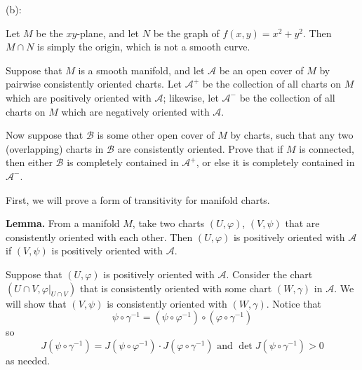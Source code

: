 \documentclass{../../../tex-setup/eh-homework}
\begin{document}
\begin{question}{43}
        \medskip

        (b):

        Let \(M\) be the \(xy\)-plane, and let \(N\) be the graph of \(f(x,y) = x^2 + y^2\). Then \(M \cap N\) is simply the origin, which is not a smooth curve.
    \end{question}
    \newpage
    \begin{question}{44}
        Suppose that $M$ is a smooth manifold, and let $\mathcal{A}$ be an open cover of $M$ by pairwise consistently oriented charts. Let $\mathcal{A}^+$ be the collection of all charts on $M$ which are positively oriented with $\mathcal{A}$; likewise, let $\mathcal{A}^-$ be the collection of all charts on $M$ which are negatively oriented with $\mathcal{A}$.

        Now suppose that $\mathcal{B}$ is some other open cover of $M$ by charts, such that any two (overlapping) charts in $\mathcal{B}$ are consistently oriented. Prove that if $M$ is connected, then either $\mathcal{B}$ is completely contained in $\mathcal{A}^+$, or else it is completely contained in $\mathcal{A}^-$.

        \tcblower

        First, we will prove a form of transitivity for manifold charts.

        \textbf{Lemma.} From a manifold \(M\), take two charts \((U, \varphi)\), \((V, \psi)\) that are consistently oriented with each other. Then \((U ,\varphi)\) is positively oriented with \(\mathcal{A}\) if \((V, \psi)\) is positively oriented with \(\mathcal{A}\).

        Suppose that \((U, \varphi)\) is positively oriented with \(\mathcal{A}\). Consider the chart \((U \cap V, \varphi | _{U \cap V})\) that is consistently oriented with some chart \((W, \gamma)\) in \(\mathcal{A}\). We will show that \((V, \psi)\) is consistently oriented with \((W, \gamma)\). Notice that
        \[
            \psi \circ \gamma^{-1} = (\psi \circ \varphi^{-1}) \circ (\varphi \circ \gamma^{-1})
        \]
        so
        \[
            J (\psi \circ \gamma^{-1}) = J (\psi \circ \varphi^{-1}) \cdot J (\varphi \circ \gamma^{-1}) \text{ and } \det J(\psi \circ \gamma^{-1}) > 0
        \]
        as needed.


\end{question}
\end{document}
